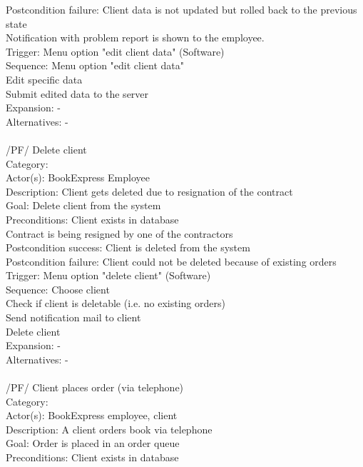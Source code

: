 \documentclass[11pt,a4paper,oneside,svgnames]{report}
\begin{document}
\begin{tabbing}
	 Postcondition failure: \> Client data is not updated but rolled back to the previous state\\
	 \> Notification with problem report is shown to the employee.\\
	 Trigger: \> Menu option "edit client data" (Software)\\
	 Sequence: \> Menu option "edit client data"\\
	 \> Edit specific data\\
	 \> Submit edited data to the server\\
	 Expansion: \> -\\
	 Alternatives: \> -\\
	 \\
	 /PF/ \> Delete client\\ 
	 Category: \> \\
	 Actor(s): \> BookExpress Employee\\ 
	 Description: \> Client gets deleted due to resignation of the contract\\ 
	 Goal: \> Delete client from the system\\
	 Preconditions: \> Client exists in database\\
	 \> Contract is being resigned by one of the contractors\\
	 Postcondition success: \> Client is deleted from the system\\
	 Postcondition failure: \> Client could not be deleted because of existing orders\\
	 Trigger: \> Menu option "delete client" (Software)\\
	 Sequence: \> Choose client\\
	 \> Check if client is deletable (i.e. no existing orders)\\
	 \> Send notification mail to client\\
	 \> Delete client\\
	 Expansion: \> -\\
	 Alternatives: \> -\\
	 \\
	 /PF/ \> Client places order (via telephone)\\ 
	 Category: \> \\
	 Actor(s): \> BookExpress employee, client\\ 
	 Description: \> A client orders book via telephone\\ 
	 Goal: \> Order is placed in an order queue\\
	 Preconditions: \> Client exists in database\\

\end{tabbing}
\end{document}
